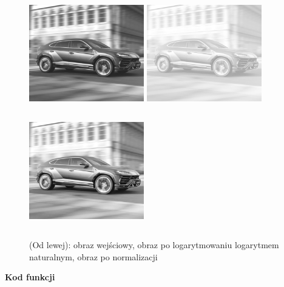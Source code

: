 \documentclass[magisterska,openany]{pracadypl}
\begin{document}
\begin{figure}[h]
\centering
\includegraphics[width=5cm, height=5cm]{orgi/gLU.jpg}
\includegraphics[width=5cm, height=5cm]{3_10/logG2.jpg}
\includegraphics[width=5cm, height=5cm]{3_10/nlogG2.jpg}
\caption{(Od lewej): obraz wejściowy, obraz po logarytmowaniu logarytmem
naturalnym, obraz po normalizacji}
\end{figure}

\newpage
\textbf{\Large Kod funkcji}
   
\end{document}
